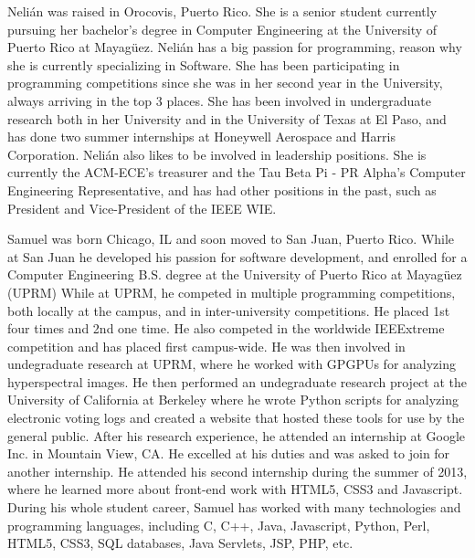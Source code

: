 \label{sec:bios}


Nelián was raised in Orocovis, Puerto Rico. She is a senior
student currently pursuing her bachelor's degree in Computer Engineering at the
University of Puerto Rico at Mayagüez. Nelián has a big passion for programming,
reason why she is currently specializing in Software. She
has been participating in programming competitions since she was in her second
year in the University, always arriving in the top 3 places. She has been involved in
undergraduate research both in her University and in the University of Texas at
El Paso,  and has done two summer internships at
Honeywell Aerospace and Harris Corporation. Nelián also likes to be
involved in leadership positions.  She is currently the ACM-ECE's treasurer and
the Tau Beta Pi - PR Alpha's Computer Engineering Representative, and has had
other positions in the past, such as President and Vice-President of the IEEE
WIE.


Samuel was born Chicago, IL and soon moved to San Juan, Puerto Rico. While at
San Juan he developed his passion for software development, and enrolled for a
Computer Engineering B.S. degree at the University of Puerto Rico at Mayagüez
(UPRM) While at UPRM, he competed in multiple programming competitions, both
locally at the campus, and in inter-university competitions. He placed 1st four
times and 2nd one time. He also competed in the worldwide IEEExtreme competition
and has placed first campus-wide. He was then involved in undegraduate research
at UPRM, where he worked with GPGPUs for analyzing hyperspectral images. He then
performed an undegraduate research project at the University of California at
Berkeley where he wrote Python scripts for analyzing electronic voting logs and
created a website that hosted these tools for use by the general public. After
his research experience, he attended an internship at Google Inc. in Mountain
View, CA. He excelled at his duties and was asked to join for another
internship. He attended his second internship during the summer of 2013, where
he learned more about front-end work with HTML5, CSS3 and Javascript. During his
whole student career, Samuel has worked with many technologies and programming
languages, including C, C++, Java, Javascript, Python, Perl, HTML5, CSS3, SQL
databases, Java Servlets, JSP, PHP, etc.

